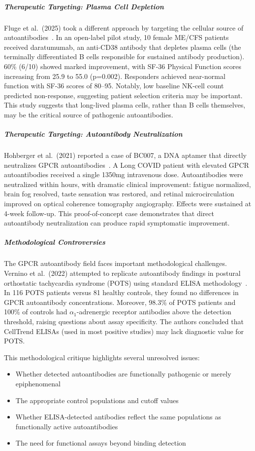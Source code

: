 \subparagraph{Therapeutic Targeting: Plasma Cell Depletion}
Fluge et al.\ (2025) took a different approach by targeting the cellular source of autoantibodies~\cite{Fluge2025daratumumab}. In an open-label pilot study, 10 female ME/CFS patients received daratumumab, an anti-CD38 antibody that depletes plasma cells (the terminally differentiated B cells responsible for sustained antibody production). 60\% (6/10) showed marked improvement, with SF-36 Physical Function scores increasing from 25.9 to 55.0 (p=0.002). Responders achieved near-normal function with SF-36 scores of 80--95. Notably, low baseline NK-cell count predicted non-response, suggesting patient selection criteria may be important. This study suggests that long-lived plasma cells, rather than B cells themselves, may be the critical source of pathogenic autoantibodies.

\subparagraph{Therapeutic Targeting: Autoantibody Neutralization}
Hohberger et al.\ (2021) reported a case of BC007, a DNA aptamer that directly neutralizes GPCR autoantibodies~\cite{Hohberger2021bc007}. A Long COVID patient with elevated GPCR autoantibodies received a single 1350mg intravenous dose. Autoantibodies were neutralized within hours, with dramatic clinical improvement: fatigue normalized, brain fog resolved, taste sensation was restored, and retinal microcirculation improved on optical coherence tomography angiography. Effects were sustained at 4-week follow-up. This proof-of-concept case demonstrates that direct autoantibody neutralization can produce rapid symptomatic improvement.

\subparagraph{Methodological Controversies}
The GPCR autoantibody field faces important methodological challenges. Vernino et al.\ (2022) attempted to replicate autoantibody findings in postural orthostatic tachycardia syndrome (POTS) using standard ELISA methodology~\cite{POTS2022failed_replication}. In 116 POTS patients versus 81 healthy controls, they found no differences in GPCR autoantibody concentrations. Moreover, 98.3\% of POTS patients and 100\% of controls had $\alpha_1$-adrenergic receptor antibodies above the detection threshold, raising questions about assay specificity. The authors concluded that CellTrend ELISAs (used in most positive studies) may lack diagnostic value for POTS.

This methodological critique highlights several unresolved issues:
\begin{itemize}
    \item Whether detected autoantibodies are functionally pathogenic or merely epiphenomenal
    \item The appropriate control populations and cutoff values
    \item Whether ELISA-detected antibodies reflect the same populations as functionally active autoantibodies
    \item The need for functional assays beyond binding detection
\end{itemize}

